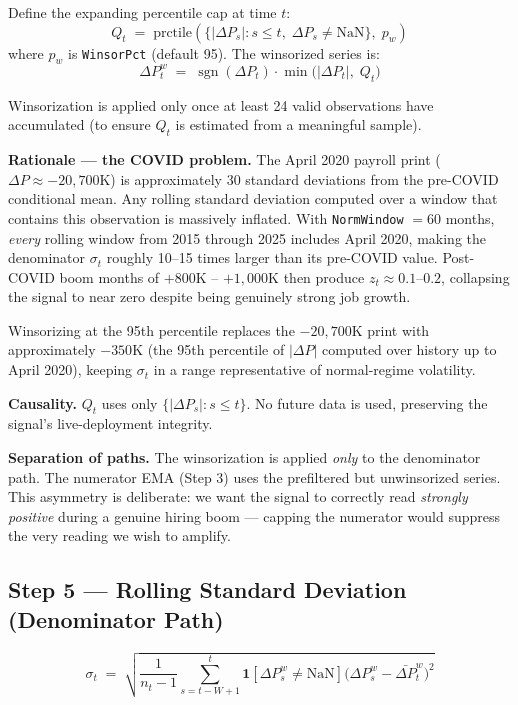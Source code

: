 \documentclass[11pt, a4paper]{article}
\DeclareMathOperator{\sgn}{sgn}
\newcommand{\dP}{\Delta P}
\begin{document}
Define the expanding percentile cap at time $t$:
\begin{equation}
  Q_t \;=\; \text{prctile}\!\left(\bigl\{|\dP_s| : s \leq t,\; \dP_s \neq \text{NaN}\bigr\},\;p_w\right)
\end{equation}
where $p_w$ is \texttt{WinsorPct} (default 95). The winsorized series is:
\begin{equation}
  \dP^w_t \;=\; \sgn(\dP_t)\cdot\min\!\bigl(|\dP_t|,\;Q_t\bigr)
\end{equation}

Winsorization is applied only once at least 24 valid observations
have accumulated (to ensure $Q_t$ is estimated from a meaningful sample).

\textbf{Rationale — the COVID problem.} The April 2020 payroll print
($\dP \approx -20{,}700$K) is approximately 30 standard deviations
from the pre-COVID conditional mean. Any rolling standard deviation
computed over a window that contains this observation is massively
inflated. With \texttt{NormWindow} $= 60$ months, \emph{every}
rolling window from 2015 through 2025 includes April 2020, making
the denominator $\sigma_t$ roughly 10--15 times larger than its
pre-COVID value. Post-COVID boom months of $+800$K -- $+1{,}000$K
then produce $z_t \approx 0.1$--$0.2$, collapsing the signal to near
zero despite being genuinely strong job growth.

Winsorizing at the 95th percentile replaces the $-20{,}700$K print
with approximately $-350$K (the 95th percentile of $|\dP|$ computed
over history up to April 2020), keeping $\sigma_t$ in a range
representative of normal-regime volatility.

\textbf{Causality.} $Q_t$ uses only $\{|\dP_s| : s \leq t\}$. No
future data is used, preserving the signal's live-deployment
integrity.

\textbf{Separation of paths.} The winsorization is applied
\emph{only} to the denominator path. The numerator EMA (Step 3)
uses the prefiltered but unwinsorized series. This asymmetry is
deliberate: we want the signal to correctly read \emph{strongly
positive} during a genuine hiring boom — capping the numerator would
suppress the very reading we wish to amplify.

\subsection{Step 5 — Rolling Standard Deviation (Denominator Path)}
\label{sec:step5}

\begin{equation}
  \sigma_t \;=\; \sqrt{\frac{1}{n_t - 1}
    \sum_{s=t-W+1}^{t} \mathbf{1}[\dP^w_s \neq \text{NaN}]
    \bigl(\dP^w_s - \bar{\dP}^w_t\bigr)^2}
\end{equation}
\end{document}
